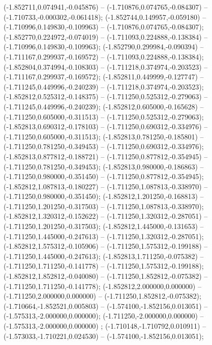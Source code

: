  (-1.852711,0.074941,-0.045876) -- (-1.710876,0.074765,-0.084307) -- (-1.710733,-0.000302,-0.061418);
 (-1.852744,0.149957,-0.059180) -- (-1.710996,0.149830,-0.109963) -- (-1.710876,0.074765,-0.084307);
 (-1.852770,0.224972,-0.074019) -- (-1.711093,0.224888,-0.138384) -- (-1.710996,0.149830,-0.109963);
 (-1.852790,0.299984,-0.090394) -- (-1.711167,0.299937,-0.169572) -- (-1.711093,0.224888,-0.138384);
 (-1.852804,0.374994,-0.108303) -- (-1.711218,0.374974,-0.203523) -- (-1.711167,0.299937,-0.169572);
 (-1.852811,0.449999,-0.127747) -- (-1.711245,0.449996,-0.240239) -- (-1.711218,0.374974,-0.203523);
 (-1.852812,0.525312,-0.148375) -- (-1.711250,0.525312,-0.279063) -- (-1.711245,0.449996,-0.240239);
 (-1.852812,0.605000,-0.165628) -- (-1.711250,0.605000,-0.311513) -- (-1.711250,0.525312,-0.279063);
 (-1.852813,0.690312,-0.178103) -- (-1.711250,0.690312,-0.334976) -- (-1.711250,0.605000,-0.311513);
 (-1.852813,0.781250,-0.185801) -- (-1.711250,0.781250,-0.349453) -- (-1.711250,0.690312,-0.334976);
 (-1.852813,0.877812,-0.188721) -- (-1.711250,0.877812,-0.354945) -- (-1.711250,0.781250,-0.349453);
 (-1.852813,0.980000,-0.186863) -- (-1.711250,0.980000,-0.351450) -- (-1.711250,0.877812,-0.354945);
 (-1.852812,1.087813,-0.180227) -- (-1.711250,1.087813,-0.338970) -- (-1.711250,0.980000,-0.351450);
 (-1.852812,1.201250,-0.168813) -- (-1.711250,1.201250,-0.317503) -- (-1.711250,1.087813,-0.338970);
 (-1.852812,1.320312,-0.152622) -- (-1.711250,1.320312,-0.287051) -- (-1.711250,1.201250,-0.317503);
 (-1.852812,1.445000,-0.131653) -- (-1.711250,1.445000,-0.247613) -- (-1.711250,1.320312,-0.287051);
 (-1.852812,1.575312,-0.105906) -- (-1.711250,1.575312,-0.199188) -- (-1.711250,1.445000,-0.247613);
 (-1.852813,1.711250,-0.075382) -- (-1.711250,1.711250,-0.141778) -- (-1.711250,1.575312,-0.199188);
 (-1.852812,1.852812,-0.040080) -- (-1.711250,1.852812,-0.075382) -- (-1.711250,1.711250,-0.141778);
 (-1.852812,2.000000,0.000000) -- (-1.711250,2.000000,0.000000) -- (-1.711250,1.852812,-0.075382);
 (-1.710664,-1.852521,0.005803) -- (-1.574100,-1.852156,0.013051) -- (-1.575313,-2.000000,0.000000);
 (-1.711250,-2.000000,0.000000) -- (-1.575313,-2.000000,0.000000) ;
 (-1.710148,-1.710792,0.010911) -- (-1.573033,-1.710221,0.024530) -- (-1.574100,-1.852156,0.013051);
